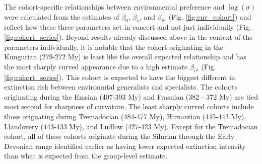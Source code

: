 \documentclass{article}
\begin{document}
The cohort-specific relationships between environmental preference and \(\log(\sigma)\) were calculated from the estimates of \(\beta_{0}\), \(\beta_{v}\), and \(\beta_{v^{2}}\) (Fig. \ref{fig:env_cohort}) and reflect how these three parameters act in concert and not just individually (Fig. \ref{fig:cohort_series}). Beyond results already discussed above in the context of the parameters individually, it is notable that the cohort originating in the Kungurian (279-272 My) is least like the overall expected relationship and has the most sharply curved appearance due to a high estimate \(\beta_{v^{2}}\) (Fig. \ref{fig:cohort_series}). This cohort is expected to have the biggest different in extinction risk between environmtal generalists and specialists. The cohorts originating during the Emsian (407-393 My) and Frasnian (382 - 372 My) are tied most second for sharpness of curvature. The least sharply curved cohorts include those orignating during Tremadocian (484-477 My), Hirnantian (445-443 My), Llandovery (443-433 My), and Ludlow (427-423 My). Except for the Tremadocian cohort, all of these cohorts originate during the Silurian through the Early Devonian range identified earlier as having lower expected extinction intensity than what is expected from the group-level estimate.
\end{document}
